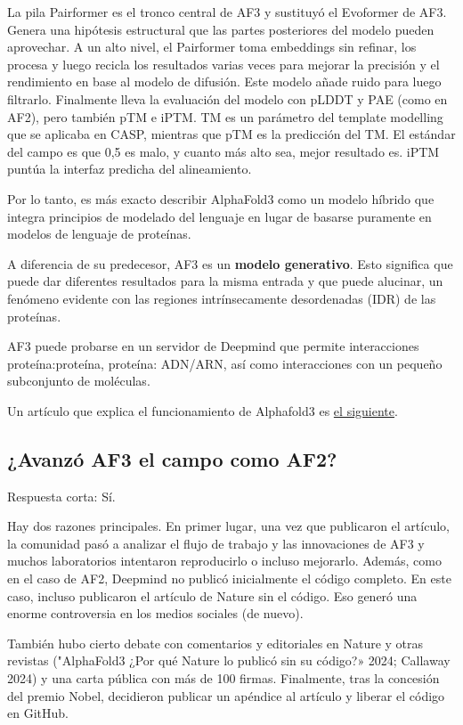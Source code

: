 La pila Pairformer es el tronco central de AF3 y sustituyó el Evoformer de AF3. Genera una hipótesis estructural que las partes posteriores del modelo pueden aprovechar. A un alto nivel, el Pairformer toma embeddings sin refinar, los procesa y luego recicla los resultados varias veces para mejorar la precisión y el rendimiento en base al modelo de difusión. Este modelo añade ruido para luego filtrarlo. Finalmente lleva la evaluación del modelo con pLDDT y PAE (como en AF2), pero también pTM e iPTM. TM es un parámetro del template modelling que se aplicaba en CASP, mientras que pTM es la predicción del TM. El estándar del campo es que 0,5 es malo, y cuanto más alto sea, mejor resultado es. iPTM puntúa la interfaz predicha del alineamiento.

Por lo tanto, es más exacto describir AlphaFold3 como un modelo híbrido que integra principios de modelado del lenguaje en lugar de basarse puramente en modelos de lenguaje de proteínas.

A diferencia de su predecesor, AF3 es un \textbf{modelo generativo}. Esto significa que puede dar diferentes resultados para la misma entrada y que puede alucinar, un fenómeno evidente con las regiones intrínsecamente desordenadas (IDR) de las proteínas.

AF3 puede probarse en un servidor de Deepmind que permite interacciones proteína:proteína, proteína: ADN/ARN, así como interacciones con un pequeño subconjunto de moléculas.

Un artículo que explica el funcionamiento de Alphafold3 es \href{https://research.dimensioncap.com/p/an-opinionated-alphafold3-field-guide}{el siguiente}.

\subsection{¿Avanzó AF3 el campo como AF2?}
Respuesta corta: Sí.

Hay dos razones principales. En primer lugar, una vez que publicaron el artículo, la comunidad pasó a analizar el flujo de trabajo y las innovaciones de AF3 y muchos laboratorios intentaron reproducirlo o incluso mejorarlo. Además, como en el caso de AF2, Deepmind no publicó inicialmente el código completo. En este caso, incluso publicaron el artículo de Nature sin el código. Eso generó una enorme controversia en los medios sociales (de nuevo).

También hubo cierto debate con comentarios y editoriales en Nature y otras revistas ("AlphaFold3 ¿Por qué Nature lo publicó sin su código?» 2024; Callaway 2024) y una carta pública con más de 100 firmas. Finalmente, tras la concesión del premio Nobel, decidieron publicar un apéndice al artículo y liberar el código en GitHub.

